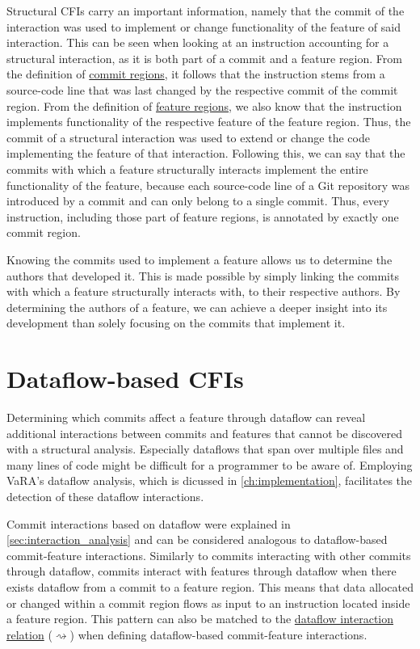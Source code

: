 Structural CFIs carry an important information, namely that the commit of the interaction was used to implement or change functionality of the feature of said interaction.
This can be seen when looking at an instruction accounting for a structural interaction, as it is both part of a commit and a feature region.
From the definition of \hyperref[def:commit_regions]{commit regions}, it follows that the instruction stems from a source-code line that was last changed by the respective commit of the commit region. 
From the definition of \hyperref[def:feature_regions]{feature regions}, we also know that the instruction implements functionality of the respective feature of the feature region. 
Thus, the commit of a structural interaction was used to extend or change the code implementing the feature of that interaction.
Following this, we can say that the commits with which a feature structurally interacts implement the entire functionality of the feature, because each source-code line of a Git repository was introduced by a commit and can only belong to a single commit.
Thus, every instruction, including those part of feature regions, is annotated by exactly one commit region. 

Knowing the commits used to implement a feature allows us to determine the authors that developed it.
This is made possible by simply linking the commits with which a feature structurally interacts with, to their respective authors.
By determining the authors of a feature, we can achieve a deeper insight into its development than solely focusing on the commits that implement it. 

\section{Dataflow-based CFIs}\label{sec:dataflow_cfis}

Determining which commits affect a feature through dataflow can reveal additional interactions between commits and features that cannot be discovered with a structural analysis.
Especially dataflows that span over multiple files and many lines of code might be difficult for a programmer to be aware of.
Employing VaRA's dataflow analysis, which is dicussed in \autoref{ch:implementation}, facilitates the detection of these dataflow interactions. 

Commit interactions based on dataflow were explained in \autoref{sec:interaction_analysis} and can be considered analogous to dataflow-based commit-feature interactions.
Similarly to commits interacting with other commits through dataflow, commits interact with features through dataflow when there exists dataflow from a commit to a feature region.
This means that data allocated or changed within a commit region flows as input to an instruction located inside a feature region.
This pattern can also be matched to the \hyperref[def:dataflow_relation]{dataflow interaction relation} ($\rightsquigarrow$) when defining dataflow-based commit-feature interactions.

